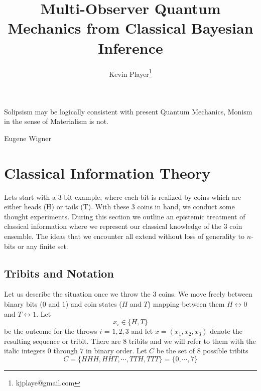 \documentclass[12pt,a4paper]{article}
\theoremstyle{myrule}
\theoremstyle{postulate}
\theoremstyle{definition}
\begin{document}
\title{Multi-Observer Quantum Mechanics from Classical Bayesian Inference}
\author[1]{Kevin Player\footnote{kjplaye@gmail.com}}

\maketitle


\epigraph{Solipsism may be logically consistent with present Quantum Mechanics, Monism in the sense of Materialism is not.}{Eugene Wigner}


\section{Classical Information Theory}
Lets start with a 3-bit example, where each bit is realized by coins which are either heads (H) or tails (T).  With these 3 coins in hand, we conduct some thought experiments.  During this section we outline an epistemic treatment of classical information where we represent our classical knowledge of the 3 coin ensemble. The ideas that we encounter all extend without loss of generality to $n$-bits or any finite set.

\subsection{Tribits and Notation}
Let us describe the situation once we throw the 3 coins.  We move freely between binary bits ($0$ and $1$) and coin states ($H$ and $T$) mapping between them $H \leftrightarrow 0$ and $T \leftrightarrow 1$. Let
\[
x_i \in \{H,T\}
\]
be the outcome for the throws $i$ = $1,2,3$ and let $x = (x_1, x_2, x_3)$ denote the resulting sequence or tribit.  There are 8 tribits and we will refer to them with the italic integers $\mathit{0}$ through $\mathit{7}$ in binary order.  Let $C$ be the set of 8 possible tribits
\[
 C = \{HHH,HHT,\cdots,TTH, TTT\} = \{\mathit{0},\cdots,\mathit{7}\}
\]
  
\end{document}
